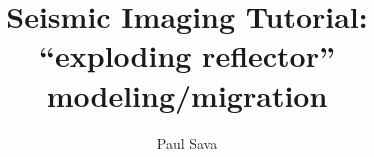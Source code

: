 \author{Paul Sava}
\title{Seismic Imaging Tutorial: ``exploding reflector'' modeling/migration}
\maketitle

\begin{abstract}
\end{abstract}
